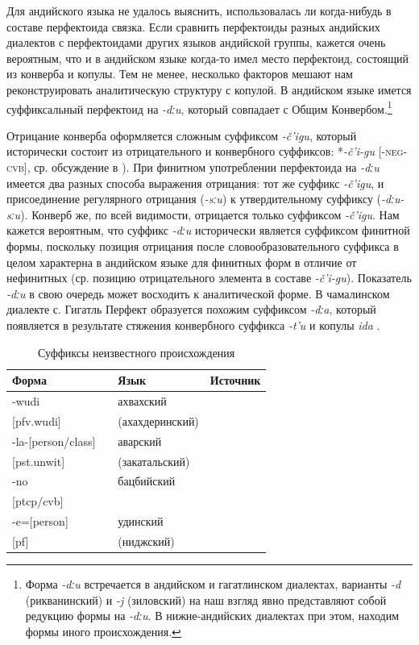 Для андийского языка не удалось выяснить, использовалась ли когда-нибудь в составе перфектоида связка. Если сравнить перфектоиды разных андийских диалектов с перфектоидами других языков андийской группы, кажется очень вероятным, что и в андийском языке когда-то имел место перфектоид, состоящий из конверба и копулы. Тем не менее, несколько факторов мешают нам реконструировать аналитическую структуру с копулой. В андийском языке имется суффиксальный перфектоид на \textit{-dːu}, который совпадает с Общим Конвербом.\footnote{Форма \textit{-dːu} встречается в андийском и гагатлинском диалектах, варианты \textit{-d} (рикванинский) и \textit{-j} (зиловский) на наш взгляд явно представляют собой редукцию формы на \textit{-dːu}. В нижне-андийских диалектах при этом, находим формы иного происхождения.} 
\par Отрицание конверба оформляется сложным суффиксом \textit{-č’igu}, который исторически состоит из отрицательного и конвербного суффиксов: *\textit{-č’i-gu} [\textsc{-neg-cvb}], ср. обсуждение в \citep[202--203]{verhees2019}). При финитном употреблении перфектоида на \textit{-dːu} имеется два разных способа выражения отрицания: тот же суффикс \textit{-č’igu}, и присоединение регулярного отрицания (\textit{-sːu}) к утвердительному суффиксу (\textit{-dːu-sːu}). Конверб же, по всей видимости, отрицается только суффиксом \textit{-č’igu}. Нам кажется вероятным, что суффикс \textit{-dːu} исторически является суффиксом финитной формы, поскольку позиция отрицания после словообразовательного суффикса в целом характерна в андийском языке для финитных форм в отличие от нефинитных (ср. позицию отрицательного элемента в составе \textit{-č’i-gu}). Показатель \textit{-dːu} в свою очередь может восходить к аналитической форме. В чамалинском диалекте с. Гигатль Перфект образуется похожим суффиксом \textit{-dːa}, который появляется в результате стяжения конвербного суффикса \textit{-t’u} и копулы \textit{ida} \citep[105]{bokarev1949chamalal}.

\begin{table}[ht]
\caption{Суффиксы неизвестного происхождения}
\label{tab:suff}
\vspace{0.2cm}
\begin{center}
\begin{tabular}{ll|ll}
\multicolumn{2}{l|}{Форма} & Язык      & Источник   \\ \hline
-wudi	&		&	ахвахский	&	\citep{creissels2018}	\\
{[}pfv.wudi{]}	&		&	(ахахдеринский)	&		\\
-la-{[}person/class{]}	&		&	аварский	&	\citep{saidova2007}	\\
{[}pst.unwit{]}	&		&	(закатальский)	&		\\
-no 	&		&	бацбийский	&	\citep{holiskygagua1994}	\\
{[}ptcp/cvb{]}	&		&		&		\\
-e={[}person{]}	&		&	удинский	&	\citep{maisak2018}	\\
{[}pf{]}	&		&	(ниджский)	&		\\
\end{tabular}
\end{center}
\end{table}


